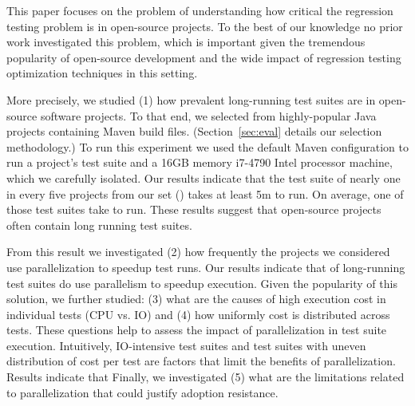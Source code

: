 
\sloppy This paper focuses on the problem of understanding how
critical the regression testing problem is in open-source projects.
To the best of our knowledge no prior work investigated this problem,
which is important given the tremendous popularity of open-source
development and the wide impact of regression testing optimization
techniques in this setting.


More precisely, we studied (1) how prevalent long-running test suites
are in open-source software projects.  To that end, we selected from
\github{} \numSubjs{} highly-popular Java projects containing Maven
build files.  (Section~\ref{sec:eval} details our selection
methodology.)  To run this experiment we used the default Maven
configuration to run a project's test suite and a 16GB memory i7-4790
Intel processor machine, which we carefully isolated.  Our results
indicate that the test suite of nearly one in every five projects from
our set (\percentMedLongRunning) takes at least 5m to run.  On
average, one of those test suites take \averageMedLongRunning{} to
run.  These results suggest that open-source projects often contain
long running test suites.

  From this result we investigated (2) how frequently
the projects we considered use parallelization to speedup test runs.
Our results indicate that \percentParallelForLongRunning{} of
long-running test suites do use parallelism to speedup execution.
Given the popularity of this solution, we further studied: (3) what
are the causes of high execution cost in individual tests (CPU vs. IO)
and (4) how uniformly cost is distributed across tests.  These
questions help to assess the impact of parallelization in test suite
execution.  Intuitively, IO-intensive test suites and test suites with
uneven distribution of cost per test are factors that limit the
benefits of parallelization.  Results indicate that 
Finally, we investigated (5) what are the limitations related to
parallelization that could justify adoption resistance.

